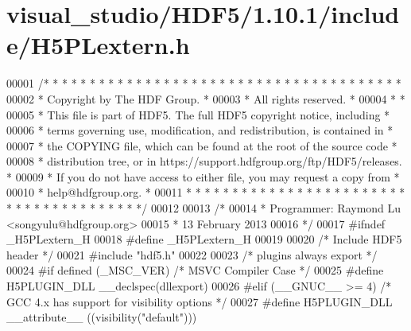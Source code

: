 \hypertarget{visual__studio_2_h_d_f5_21_810_81_2include_2_h5_p_lextern_8h_source}{}\section{visual\+\_\+studio/\+H\+D\+F5/1.10.1/include/\+H5\+P\+Lextern.h}
\label{visual__studio_2_h_d_f5_21_810_81_2include_2_h5_p_lextern_8h_source}

\begin{DoxyCode}
00001 \textcolor{comment}{/* * * * * * * * * * * * * * * * * * * * * * * * * * * * * * * * * * * * * * *}
00002 \textcolor{comment}{ * Copyright by The HDF Group.                                               *}
00003 \textcolor{comment}{ * All rights reserved.                                                      *}
00004 \textcolor{comment}{ *                                                                           *}
00005 \textcolor{comment}{ * This file is part of HDF5. The full HDF5 copyright notice, including      *}
00006 \textcolor{comment}{ * terms governing use, modification, and redistribution, is contained in    *}
00007 \textcolor{comment}{ * the COPYING file, which can be found at the root of the source code       *}
00008 \textcolor{comment}{ * distribution tree, or in https://support.hdfgroup.org/ftp/HDF5/releases.  *}
00009 \textcolor{comment}{ * If you do not have access to either file, you may request a copy from     *}
00010 \textcolor{comment}{ * help@hdfgroup.org.                                                        *}
00011 \textcolor{comment}{ * * * * * * * * * * * * * * * * * * * * * * * * * * * * * * * * * * * * * * */}
00012 
00013 \textcolor{comment}{/*}
00014 \textcolor{comment}{ * Programmer:  Raymond Lu <songyulu@hdfgroup.org>}
00015 \textcolor{comment}{ *              13 February 2013}
00016 \textcolor{comment}{ */}
00017 \textcolor{preprocessor}{#ifndef \_H5PLextern\_H}
00018 \textcolor{preprocessor}{#define \_H5PLextern\_H}
00019 
00020 \textcolor{comment}{/* Include HDF5 header */}
00021 \textcolor{preprocessor}{#include "hdf5.h"}
00022 
00023 \textcolor{comment}{/* plugins always export */}
00024 \textcolor{preprocessor}{#if defined (\_MSC\_VER)  }\textcolor{comment}{/* MSVC Compiler Case */}\textcolor{preprocessor}{}
00025 \textcolor{preprocessor}{  #define H5PLUGIN\_DLL \_\_declspec(dllexport)}
00026 \textcolor{preprocessor}{#elif (\_\_GNUC\_\_ >= 4)  }\textcolor{comment}{/* GCC 4.x has support for visibility options */}\textcolor{preprocessor}{}
00027 \textcolor{preprocessor}{  #define H5PLUGIN\_DLL \_\_attribute\_\_ ((visibility("default")))}

\end{DoxyCode}
